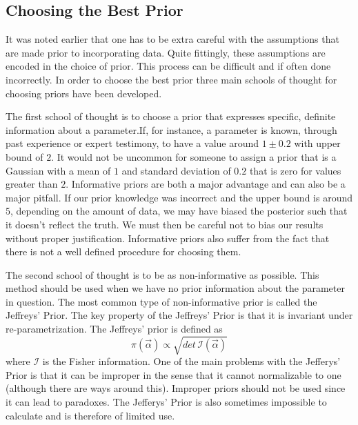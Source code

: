 \documentclass[12pt]{article}
\numberwithin{equation}{section}
\begin{document}
\subsection{Choosing the Best Prior}
It was noted earlier that one has to be extra careful with the assumptions that are made prior to incorporating data. Quite fittingly, these assumptions are encoded in the choice of prior. This process can be difficult and if often done incorrectly. In order to choose the best prior three main schools of thought for choosing priors have been developed. 

The first school of thought is to choose a prior that expresses specific, definite information about a parameter.If, for instance, a parameter is known, through past experience or expert testimony, to have a value around $1 \pm 0.2$ with upper bound of $2$. It would not be uncommon for someone to assign a prior that is a Gaussian with a mean of $1$ and standard deviation of $0.2$ that is zero for values greater than $2$. Informative priors are both a major advantage and can also be a major pitfall. If our prior knowledge was incorrect and the upper bound is around $5$, depending on the amount of data, we may have biased the posterior such that it doesn't reflect the truth. We must then be careful not to bias our results without proper justification. Informative priors also suffer from the fact that there is not a well defined procedure for choosing them. 

The second school of thought is to be as non-informative as possible. This method should be used when we have no prior information about the parameter in question. The most common type of non-informative prior is called the Jeffreys' Prior. The key property of the Jeffreys' Prior is that it is invariant under re-parametrization. The Jeffreys' prior is defined as 
\begin{equation} \label{eq:jefferys}
	\pi(\vec{\alpha}) \propto \sqrt{det \,\mathcal{I}(\vec{\alpha})}
\end{equation}
where $\mathcal{I}$ is the Fisher information. One of the main problems with the Jefferys' Prior is that it can be improper in the sense that it cannot normalizable to one (although there are ways around this). Improper priors should not be used since it can lead to paradoxes.\cite{von2011bayesian} The Jefferys' Prior is also sometimes impossible to calculate and is therefore of limited use.
\end{document}
